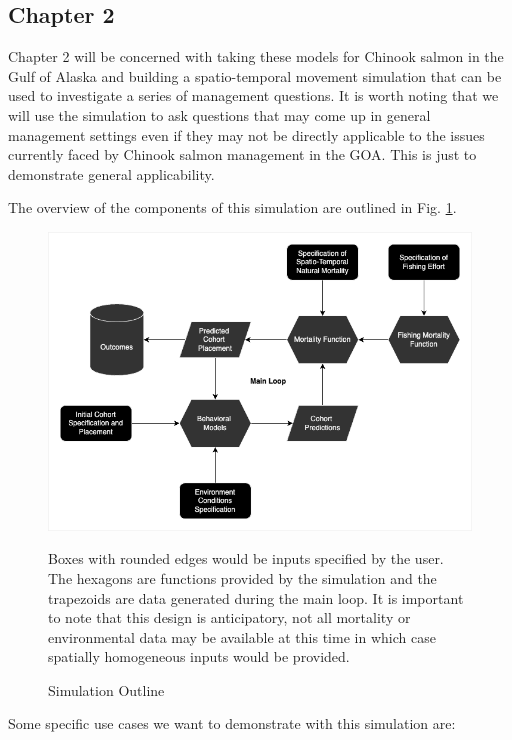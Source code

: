 \documentclass[11pt]{article}
\begin{document}
\subsection{Chapter 2}

Chapter 2 will be concerned with taking these models for Chinook salmon in the Gulf of Alaska and building a spatio-temporal movement simulation that can be used to investigate a series of management questions. It is worth noting that we will use the simulation to ask questions that may come up in general management settings even if they may not be directly applicable to the issues currently faced by Chinook salmon management in the GOA. This is just to demonstrate general applicability. \newline

The overview of the components of this simulation are outlined in Fig. \ref{fig:simulation}. 

\begin{figure}[h!] 
  \includegraphics[width=\linewidth]{simulation.png}
  \caption{Simulation Outline}
  \medskip
	\small
	Boxes with rounded edges would be inputs specified by the user. The hexagons are functions 		provided by the simulation and the trapezoids are data generated during the main loop. It is important to note that this design is anticipatory, not all mortality or environmental data may be available at this time in which case spatially homogeneous inputs would be provided.  
  \label{fig:simulation}
\end{figure}


Some specific use cases we want to demonstrate with this simulation are:
\end{document}
